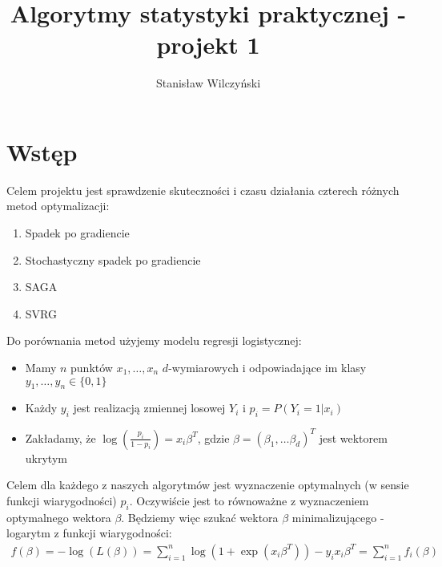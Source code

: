 \documentclass[a4paper]{article}
\title{Algorytmy statystyki praktycznej - projekt 1}
\author{Stanisław Wilczyński}
\begin{document}
\maketitle
\section{Wstęp}

Celem projektu jest sprawdzenie skuteczności i czasu działania czterech różnych metod optymalizacji:
\begin{enumerate}
	\item Spadek po gradiencie
    \item Stochastyczny spadek po gradiencie
    \item SAGA \cite{SAGA}
    \item SVRG \cite{SVRG}
\end{enumerate}
Do porównania metod użyjemy modelu regresji logistycznej:
\begin{itemize}
\item Mamy $n$ punktów $x_1, \ldots, x_n$ $d$-wymiarowych i odpowiadające im klasy $y_1, \ldots, y_n \in \{0,1\}$
\item Każdy $y_i$ jest realizacją zmiennej losowej $Y_i$ i $p_i = P(Y_i=1|x_i)$
\item Zakładamy, że $ \log(  \frac{p_i}{1-p_i}) = x_i \beta^T$, gdzie $\beta = (\beta_1, \ldots \beta_d)^T$ jest wektorem ukrytym
\end{itemize}

Celem dla każdego z naszych algorytmów jest wyznaczenie optymalnych (w sensie funkcji wiarygodności) $p_i$. Oczywiście jest to równoważne z wyznaczeniem optymalnego wektora $\beta$. Będziemy więc szukać wektora $\beta$ minimalizującego -logarytm z funkcji wiarygodności:
\begin{align*}
f(\beta) = -\log(L(\beta)) = \sum_{i=1}^n \log\left( 1+\exp(x_i\beta^T)\right) - y_ix_i\beta^T = \sum_{i=1}^n f_i(\beta)
\end{align*}
\end{document}
